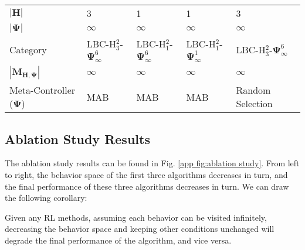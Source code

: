 \begin{table*}[!htbp]
{\begin{tabular}{l l l l l}
                   $ |\mathbf{H}| $ & 3 & 1 & 1 &  3 \\
                   
                   
                   
                   $ |\bm{\Psi}| $ & $\infty$ & $\infty$ & $\infty$ & $\infty$  \\
                   
                   
                
                  
                 Category   & LBC-H$^\text{2}_\text{3}$-$\bm{\Psi}^\text{6}_{\infty}$ &  LBC-H$^\text{2}_\text{1}$-$\bm{\Psi}^\text{6}_{\infty}$  & LBC-H$^\text{2}_\text{1}$-$\bm{\Psi}^\text{1}_{\infty}$ & LBC-H$^\text{2}_\text{3}$-$\bm{\Psi}^\text{6}_{\infty}$  \\
                 
                 $|\mathbf{M}_{\mathbf{H},\bm{\Psi}} |$ & $\infty$ & $\infty$ & $\infty$ & $\infty$ \\
                 
                 Meta-Controller ($\bm{\Psi}$)
                 & MAB   
                 & MAB   
                 & MAB 
                 & Random Selection             \\
    \bottomrule
    \end{tabular}
    }
\end{table*}
\normalsize

\subsection{Ablation Study Results}





The ablation study results can be found in Fig. \ref{app fig:ablation study}. From left to right, the behavior space of
the first three algorithms decreases in turn, and the final performance of these three algorithms decreases in turn. We can draw the following corollary:

\begin{Corollary}
\label{Corollary: Smaller Behavior Space, Lower Final Performance}
    Given any RL methods, assuming each behavior can be visited infinitely, decreasing the behavior space and keeping other conditions unchanged will degrade the final performance of the algorithm,  and vice versa.
\end{Corollary}

